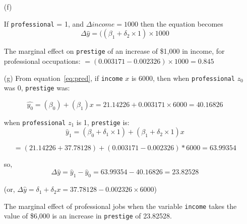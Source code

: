 \documentclass[12pt,letterpaper]{article}
\begin{document}
\begin{enumerate}
	\item [(f)]
	
	If \texttt{professional} = 1, and $\Delta income = 1000$ then the equation becomes 
  \[\Delta\hat{y} = ((\beta_1 +\delta_2\times 1)\times  1000 \]

  The marginal effect on \texttt{prestige} of an increase of \$1,000 in income, for professional occupations:  
  $ = (0.003171-0.002326)\times 1000 = 0.845$
  
	\item [(g)]
	From equation~\ref{eq:pred}, if \texttt{income} $x$ is 6000, then when \texttt{professional} $z_0$ was 0, \texttt{prestige} was:

  \[\hat{y_0} = (\beta_0) + (\beta_1) x = 21.14226 + 0.003171\times 6000 = 40.16826\]
	
	when \texttt{professional} $z_1$ is 1, \texttt{prestige} is:
  \[\hat{y}_1  = (\beta_0 + \delta_1\times 1) + (\beta_1 +\delta_2\times 1) x  \]
      
      \[= (21.14226 + 37.78128) + (0.003171-0.002326)*6000 = 63.99354  \]
	
  so, \[\Delta\hat{y} = \hat{y}_1 - \hat{y}_0 = 63.99354 - 40.16826 = 23.82528 \]

	(or, $\Delta\hat{y}  =  \delta_1 + \delta_2 x = 37.78128-0.002326\times 6000 $)
  
  The marginal effect of professional jobs when the variable \texttt{income} takes the value of \$6,000 is an increase in \texttt{prestige} of 23.82528.
  
\end{enumerate}

\newpage
\end{document}
